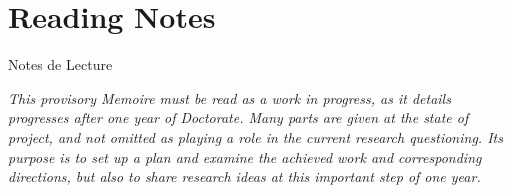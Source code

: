 



\begingroup
\let\clearpage\relax
\let\cleardoublepage\relax
\let\cleardoublepage\relax

\chapter*{Reading Notes}{Notes de Lecture}

\textit{This provisory Memoire must be read as a work in progress, as it details progresses after one year of Doctorate. Many parts are given at the state of project, and not omitted as playing a role in the current research questioning. Its purpose is to set up a plan and examine the achieved work and corresponding directions, but also to share research ideas at this important step of one year.}




\endgroup			

\vfill



